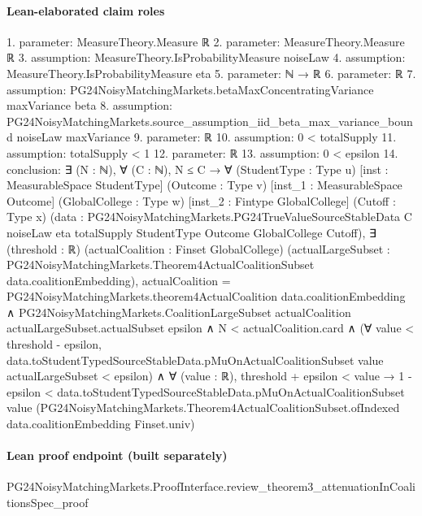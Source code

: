 \documentclass[10pt]{article}
\begin{document}
\paragraph{Lean-elaborated claim roles}\begin{ReviewVerbatim}
1. parameter: MeasureTheory.Measure ℝ
2. parameter: MeasureTheory.Measure ℝ
3. assumption: MeasureTheory.IsProbabilityMeasure noiseLaw
4. assumption: MeasureTheory.IsProbabilityMeasure eta
5. parameter: ℕ → ℝ
6. parameter: ℝ
7. assumption: PG24NoisyMatchingMarkets.betaMaxConcentratingVariance maxVariance beta
8. assumption: PG24NoisyMatchingMarkets.source_assumption_iid_beta_max_variance_bound noiseLaw maxVariance
9. parameter: ℝ
10. assumption: 0 < totalSupply
11. assumption: totalSupply < 1
12. parameter: ℝ
13. assumption: 0 < epsilon
14. conclusion: ∃ (N : ℕ),
  ∀ (C : ℕ),
    N ≤ C →
      ∀ (StudentType : Type u) [inst : MeasurableSpace StudentType] (Outcome : Type v)
        [inst_1 : MeasurableSpace Outcome] (GlobalCollege : Type w) [inst_2 : Fintype GlobalCollege] (Cutoff : Type x)
        (data :
          PG24NoisyMatchingMarkets.PG24TrueValueSourceStableData C noiseLaw eta totalSupply StudentType Outcome
            GlobalCollege Cutoff),
        ∃ (threshold : ℝ) (actualCoalition : Finset GlobalCollege) (actualLargeSubset :
          PG24NoisyMatchingMarkets.Theorem4ActualCoalitionSubset data.coalitionEmbedding),
          actualCoalition = PG24NoisyMatchingMarkets.theorem4ActualCoalition data.coalitionEmbedding ∧
            PG24NoisyMatchingMarkets.CoalitionLargeSubset actualCoalition actualLargeSubset.actualSubset epsilon ∧
              N < actualCoalition.card ∧
                (∀ value < threshold - epsilon,
                    data.toStudentTypedSourceStableData.pMuOnActualCoalitionSubset value actualLargeSubset < epsilon) ∧
                  ∀ (value : ℝ),
                    threshold + epsilon < value →
                      1 - epsilon <
                        data.toStudentTypedSourceStableData.pMuOnActualCoalitionSubset value
                          (PG24NoisyMatchingMarkets.Theorem4ActualCoalitionSubset.ofIndexed data.coalitionEmbedding
                            Finset.univ)
\end{ReviewVerbatim}

\paragraph{Lean proof endpoint (built separately)}\begin{ReviewVerbatim}
PG24NoisyMatchingMarkets.ProofInterface.review_theorem3_attenuationInCoalitionsSpec_proof
\end{ReviewVerbatim}
\end{document}
